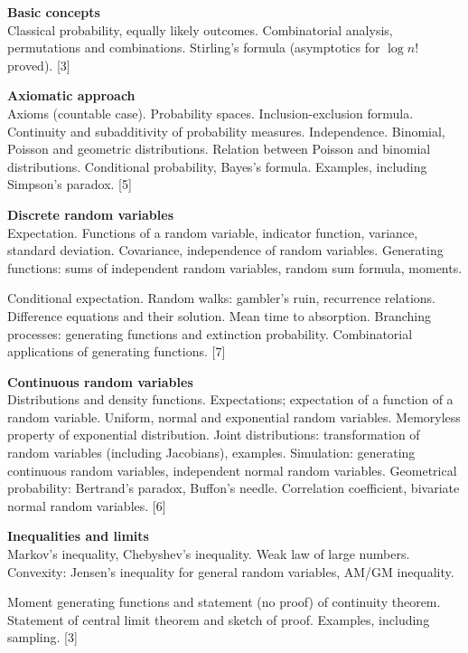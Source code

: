 \documentclass[a4paper]{article}
\begin{document}
\maketitle
{\small
  \noindent\textbf{Basic concepts}\\
  Classical probability, equally likely outcomes. Combinatorial analysis, permutations and combinations. Stirling's formula (asymptotics for $\log n!$ proved).\hspace*{\fill} [3]

  \vspace{10pt}
  \noindent\textbf{Axiomatic approach}\\
  Axioms (countable case). Probability spaces. Inclusion-exclusion formula. Continuity and subadditivity of probability measures. Independence. Binomial, Poisson and geometric distributions. Relation between Poisson and binomial distributions. Conditional probability, Bayes's formula. Examples, including Simpson's paradox.\hspace*{\fill} [5]

  \vspace{10pt}
  \noindent\textbf{Discrete random variables}\\
  Expectation. Functions of a random variable, indicator function, variance, standard deviation. Covariance, independence of random variables. Generating functions: sums of independent random variables, random sum formula, moments.

  \vspace{5pt}
  \noindent Conditional expectation. Random walks: gambler's ruin, recurrence relations. Difference equations and their solution. Mean time to absorption. Branching processes: generating functions and extinction probability. Combinatorial applications of generating functions.\hspace*{\fill} [7]

  \vspace{10pt}
  \noindent\textbf{Continuous random variables}\\
  Distributions and density functions. Expectations; expectation of a function of a random variable. Uniform, normal and exponential random variables. Memoryless property of exponential distribution. Joint distributions: transformation of random variables (including Jacobians), examples. Simulation: generating continuous random variables, independent normal random variables. Geometrical probability: Bertrand's paradox, Buffon's needle. Correlation coefficient, bivariate normal random variables.\hspace*{\fill} [6]

  \vspace{10pt}
  \noindent\textbf{Inequalities and limits}\\
  Markov's inequality, Chebyshev's inequality. Weak law of large numbers. Convexity: Jensen's inequality for general random variables, AM/GM inequality.

  \vspace{5pt}
  \noindent Moment generating functions and statement (no proof) of continuity theorem. Statement of central limit theorem and sketch of proof. Examples, including sampling.\hspace*{\fill} [3]}
\end{document}
